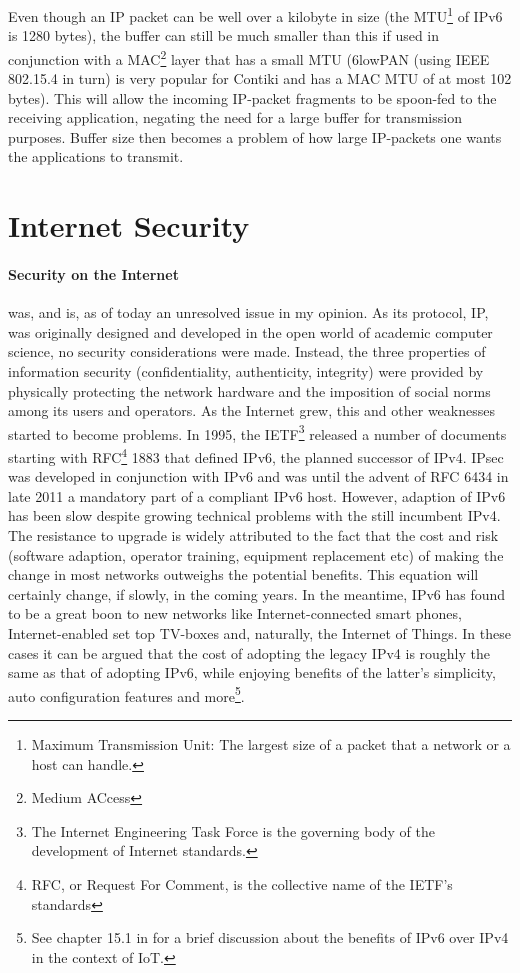 \documentclass[final,a4paper,twoside,11pt,onecolumn]{report}
\begin{document}
Even though an IP packet can be well over a kilobyte in size (the MTU\footnote{Maximum Transmission Unit: The largest size of a packet that a network or a host can handle.} of IPv6 is 1280 bytes), the buffer can still be much smaller than this if used in conjunction with a MAC\footnote{Medium ACcess} layer that has a small MTU (6lowPAN (using IEEE 802.15.4 in turn) is very popular for Contiki and has a MAC MTU of at most 102 bytes\citep[section 4]{rfc4944}). This will allow the incoming IP-packet fragments to be spoon-fed to the receiving application, negating the need for a large buffer for transmission purposes. Buffer size then becomes a problem of how large IP-packets one wants the applications to transmit.

\section{Internet Security}
\paragraph{Security on the Internet} was, and is, as of today an unresolved issue in my opinion. As its protocol, IP, was originally designed and developed in the open world of academic computer science, no security considerations were made. Instead, the three properties of information security (confidentiality, authenticity, integrity) \citep[section 8.1]{vasseur10interconnecting} were provided by physically protecting the network hardware and the imposition of social norms among its users and operators. As the Internet grew, this and other weaknesses started to become problems. In 1995, the IETF\footnote{The Internet Engineering Task Force is the governing body of the development of Internet standards.} released a number of documents starting with RFC\footnote{RFC, or Request For Comment, is the collective name of the IETF's standards} 1883\cite{rfc1883} that defined IPv6, the planned successor of IPv4. IPsec was developed in conjunction with IPv6 and was until the advent of RFC 6434\cite{rfc6434} in late 2011 a mandatory part of a compliant IPv6 host. However, adaption of IPv6 has been slow despite growing technical problems with the still incumbent IPv4. The resistance to upgrade is widely attributed to the fact that the cost and risk (software adaption, operator training, equipment replacement etc) of making the change in most networks outweighs the potential benefits. This equation will certainly change, if slowly, in the coming years. In the meantime, IPv6 has found to be a great boon to new networks like Internet-connected smart phones, Internet-enabled set top TV-boxes and, naturally, the Internet of Things. In these cases it can be argued that the cost of adopting the legacy IPv4 is roughly the same as that of adopting IPv6, while enjoying benefits of the latter's simplicity, auto configuration features and more\footnote{See chapter 15.1 in \cite{vasseur10interconnecting} for a brief discussion about the benefits of IPv6 over IPv4 in the context of IoT.}.
\end{document}
